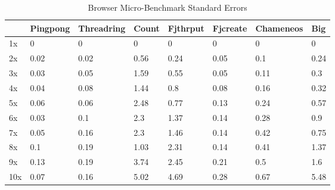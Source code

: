 \documentclass[oneside]{um-fict}
\begin{document}
\begin{table}[H]
    \begin{center}
        \begin{tabular}{|l|lllllll|}
        \hline
        & Pingpong & Threadring & Count & Fjthrput & Fjcreate & Chameneos & Big  \\ \hline
        1x  & 0        & 0          & 0     & 0        & 0        & 0         & 0    \\
        2x  & 0.02     & 0.02       & 0.56  & 0.24     & 0.05     & 0.1       & 0.24 \\
        3x  & 0.03     & 0.05       & 1.59  & 0.55     & 0.05     & 0.11      & 0.3  \\
        4x  & 0.04     & 0.08       & 1.44  & 0.8      & 0.08     & 0.16      & 0.32 \\
        5x  & 0.06     & 0.06       & 2.48  & 0.77     & 0.13     & 0.24      & 0.57 \\
        6x  & 0.03     & 0.1        & 2.3   & 1.37     & 0.14     & 0.28      & 0.9  \\
        7x  & 0.05     & 0.16       & 2.3   & 1.46     & 0.14     & 0.42      & 0.75 \\
        8x  & 0.1      & 0.19       & 1.03  & 2.31     & 0.14     & 0.41      & 1.37 \\
        9x  & 0.13     & 0.19       & 3.74  & 2.45     & 0.21     & 0.5       & 1.6  \\
        10x & 0.07     & 0.16       & 5.02  & 4.69     & 0.28     & 0.67      & 5.48 \\ \hline
        \end{tabular}
        \caption{Browser Micro-Benchmark Standard Errors}\label{tab:browserloadscalingsem}
    \end{center}
\end{table}
\end{document}
